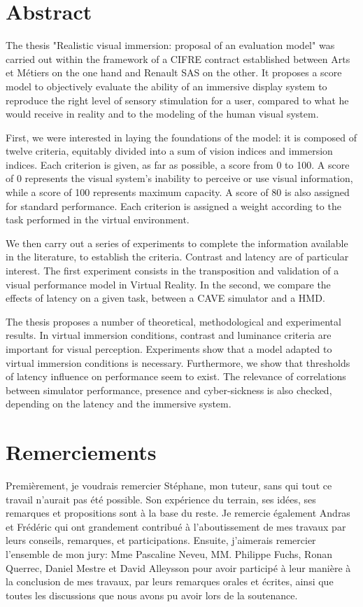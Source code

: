\chapter*{Abstract}
\par The thesis "Realistic visual immersion: proposal of an evaluation model" was carried out within the framework of a CIFRE contract established between Arts et Métiers on the one hand and Renault SAS on the other. It proposes a score model to objectively evaluate the ability of an immersive display system to reproduce the right level of sensory stimulation for a user, compared to what he would receive in reality and to the modeling of the human visual system.

\par First, we were interested in laying the foundations of the model: it is composed of twelve criteria, equitably divided into a sum of vision indices and immersion indices. Each criterion is given, as far as possible, a score from 0 to 100. A score of 0 represents the visual system's inability to perceive or use visual information, while a score of 100 represents maximum capacity. A score of 80 is also assigned for standard performance. Each criterion is assigned a weight according to the task performed in the virtual environment.

\par We then carry out a series of experiments to complete the information available in the literature, to establish the criteria. Contrast and latency are of particular interest. The first experiment consists in the transposition and validation of a visual performance model in Virtual Reality. In the second, we compare the effects of latency on a given task, between a CAVE simulator and a HMD.

\par The thesis proposes a number of theoretical, methodological and experimental results. In virtual immersion conditions, contrast and luminance criteria are important for visual perception. Experiments show that a model adapted to virtual immersion conditions is necessary. Furthermore, we show that thresholds of latency influence on performance seem to exist. The relevance of correlations between simulator performance, presence and cyber-sickness is also checked, depending on the latency and the immersive system.

\chapter*{Remerciements}
\par Premièrement, je voudrais remercier Stéphane, mon tuteur, sans qui tout ce travail n'aurait pas été possible. Son expérience du terrain, ses idées, ses remarques et propositions sont à la base du reste. Je remercie également Andras et Frédéric qui ont grandement contribué à l'aboutissement de mes travaux par leurs conseils, remarques, et participations. Ensuite, j'aimerais remercier l'ensemble de mon jury: Mme Pascaline Neveu, MM. Philippe Fuchs, Ronan Querrec, Daniel Mestre et David Alleysson pour avoir participé à leur manière à la conclusion de mes travaux, par leurs remarques orales et écrites, ainsi que toutes les discussions que nous avons pu avoir lors de la soutenance.

